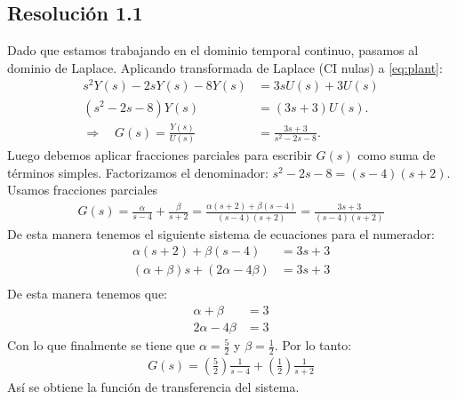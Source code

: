 \documentclass[
  11pt,
  letterpaper,
   addpoints,
  answers
  ]{exam}
\begin{document}
\begin{questions}
\begin{solution}
  \subsection*{Resolución 1.1}
  Dado que estamos trabajando en el dominio temporal continuo, pasamos al dominio de Laplace. Aplicando transformada de Laplace (CI nulas) a \eqref{eq:plant}:
  \begin{align}
      s^2 Y(s) - 2s Y(s) - 8 Y(s) &= 3s U(s) + 3 U(s) \nonumber \\
      (s^2 - 2s - 8)Y(s) &= (3s + 3)U(s). \label{eq:plant_laplace}\\
      \Longrightarrow \quad G(s)=\frac{Y(s)}{U(s)} &= \frac{3s+3}{s^{2}-2s-8}. \nonumber
  \end{align}
Luego debemos aplicar fracciones parciales para escribir $G(s)$ como suma de términos simples. Factorizamos el denominador: $s^{2}-2s-8 = (s-4)(s+2)$. Usamos fracciones parciales
\begin{align}
      G(s)=\frac{\alpha}{s-4}+\frac{\beta}{s+2} = \frac{\alpha(s+2)+\beta(s-4)}{(s-4)(s+2)}= \frac{3s+3}{(s-4)(s+2)}
\end{align}
De esta manera tenemos el siguiente sistema de ecuaciones para el numerador:
\begin{align}
  \alpha(s+2)+\beta(s-4) &= 3s+3 \nonumber \\
  (\alpha+\beta)s + (2\alpha - 4\beta) &= 3s + 3 \nonumber \\
\end{align}
De esta manera tenemos que:
\begin{align}
  \alpha + \beta &= 3 \label{eq:sistema1} \\
  2\alpha - 4\beta &= 3 \label{eq:sistema2}
\end{align}
Con lo que finalmente se tiene que $\alpha = \tfrac{5}{2}$ y $\beta = \tfrac{1}{2}$. Por lo tanto:
\begin{align}
  G(s) = \left(\frac{5}{2}\right)\frac{1}{s-4} + \left(\frac{1}{2}\right)\frac{1}{s+2}
\end{align}
Así se obtiene la función de transferencia del sistema.


\end{solution}
\end{questions}
\end{document}
